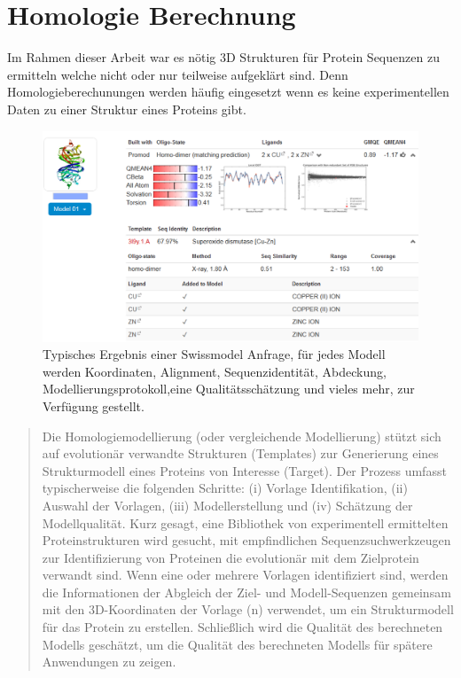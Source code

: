 \section{Homologie Berechnung}
\label{sec:siwssmodel}
Im Rahmen dieser Arbeit war es nötig 3D Strukturen für Protein Sequenzen zu ermitteln welche nicht oder nur teilweise aufgeklärt sind. Denn Homologieberechunungen werden häufig eingesetzt wenn es keine experimentellen Daten zu einer Struktur eines Proteins gibt. 
\begin{figure}
    \includegraphics[width=.95\textwidth]{images/Swissmodel.png}
    \caption{Typisches Ergebnis einer Swissmodel Anfrage, für jedes Modell werden Koordinaten, Alignment, Sequenzidentität, Abdeckung, Modellierungsprotokoll,eine Qualitätsschätzung und vieles mehr, zur Verfügung gestellt.}
    \label{fig:swissmodel}
\end{figure}

\begin{quote}
    Die Homologiemodellierung (oder vergleichende Modellierung) stützt sich auf evolutionär verwandte Strukturen (Templates) zur Generierung eines Strukturmodell eines Proteins von Interesse (Target). Der Prozess umfasst typischerweise die folgenden Schritte: (i) Vorlage Identifikation, (ii) Auswahl der Vorlagen, (iii) Modellerstellung und (iv) Schätzung der Modellqualität. Kurz gesagt, eine Bibliothek von experimentell ermittelten Proteinstrukturen wird gesucht, mit empfindlichen Sequenzsuchwerkzeugen zur Identifizierung von Proteinen die evolutionär mit dem Zielprotein verwandt sind. Wenn eine oder mehrere Vorlagen identifiziert sind, werden die Informationen der Abgleich der Ziel- und Modell-Sequenzen gemeinsam mit den 3D-Koordinaten der Vorlage (n) verwendet, um ein Strukturmodell für das Protein zu erstellen. Schließlich wird die Qualität des berechneten Modells geschätzt, um die Qualität des berechneten Modells für spätere Anwendungen zu zeigen.
\end{quote}

